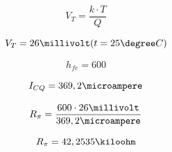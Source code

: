 \documentclass[12pt,letterpaper]{article}     %
\begin{document}
\begin{equation}
	V_T=
	\frac{
		k\cdot T
	}{
		Q
	}
\end{equation}

\begin{equation}
	V_T=
	26\millivolt
	(t=25\degree C)
\end{equation}

\begin{equation}
	h_{fe}=
	600
\end{equation}

\begin{equation}
	I_{CQ}=
	369,2\microampere
\end{equation}

\begin{equation}
	R_{\pi}=
	\frac{
		600\cdot 26\millivolt
	}{
		369,2\microampere
	}
\end{equation}

\begin{equation}
	R_{\pi}=
	42,2535\kiloohm
\end{equation}
\end{document}

